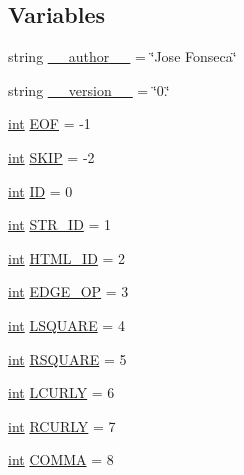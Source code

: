 \subsection*{Variables}
\begin{DoxyCompactItemize}
\item 
string \hyperlink{namespacesmacc__viewer_1_1xdot_1_1xdot__qt_a8d055c5da17b6210150c35a75a15cb2d}{\+\_\+\+\_\+author\+\_\+\+\_\+} = \char`\"{}Jose Fonseca\char`\"{}
\item 
string \hyperlink{namespacesmacc__viewer_1_1xdot_1_1xdot__qt_aaf59e47cb41bbe594478dae6c80909ce}{\+\_\+\+\_\+version\+\_\+\+\_\+} = \char`\"{}0.\char`\"{}
\item 
\hyperlink{classint}{int} \hyperlink{namespacesmacc__viewer_1_1xdot_1_1xdot__qt_a632eb3def9c4ff8ad43916a2bed70658}{E\+OF} = -\/1
\item 
\hyperlink{classint}{int} \hyperlink{namespacesmacc__viewer_1_1xdot_1_1xdot__qt_a901d8b5ee23ebb8459eaced27f937ae3}{S\+K\+IP} = -\/2
\item 
\hyperlink{classint}{int} \hyperlink{namespacesmacc__viewer_1_1xdot_1_1xdot__qt_a09a25dacdc4189c77bffc3b4da77ab2c}{ID} = 0
\item 
\hyperlink{classint}{int} \hyperlink{namespacesmacc__viewer_1_1xdot_1_1xdot__qt_ac5253622f0c2d0b988e1cc57d62d3839}{S\+T\+R\+\_\+\+ID} = 1
\item 
\hyperlink{classint}{int} \hyperlink{namespacesmacc__viewer_1_1xdot_1_1xdot__qt_ace182ad67771337ecd21e05fbaefc7bf}{H\+T\+M\+L\+\_\+\+ID} = 2
\item 
\hyperlink{classint}{int} \hyperlink{namespacesmacc__viewer_1_1xdot_1_1xdot__qt_af7416280dd42829da93d4e1713b5486c}{E\+D\+G\+E\+\_\+\+OP} = 3
\item 
\hyperlink{classint}{int} \hyperlink{namespacesmacc__viewer_1_1xdot_1_1xdot__qt_aad1cadfd64f982a2ec153bef460c4a4f}{L\+S\+Q\+U\+A\+RE} = 4
\item 
\hyperlink{classint}{int} \hyperlink{namespacesmacc__viewer_1_1xdot_1_1xdot__qt_a0adb4bae40e3099ca43f44592fad4ed0}{R\+S\+Q\+U\+A\+RE} = 5
\item 
\hyperlink{classint}{int} \hyperlink{namespacesmacc__viewer_1_1xdot_1_1xdot__qt_afb746b1f01b1a0148f336cf5ad0ba272}{L\+C\+U\+R\+LY} = 6
\item 
\hyperlink{classint}{int} \hyperlink{namespacesmacc__viewer_1_1xdot_1_1xdot__qt_a63aee9d405146303235bcbd141ef5dd5}{R\+C\+U\+R\+LY} = 7
\item 
\hyperlink{classint}{int} \hyperlink{namespacesmacc__viewer_1_1xdot_1_1xdot__qt_a033b147ed345ecb67165adfc27de5b39}{C\+O\+M\+MA} = 8

\end{DoxyCompactItemize}
